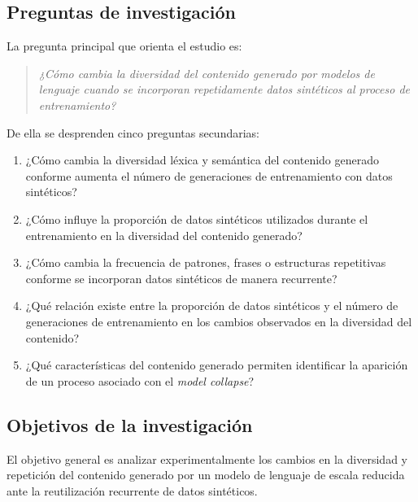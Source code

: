 \documentclass[12pt,letterpaper]{article}
\begin{document}
\subsection{Preguntas de investigación}

La pregunta principal que orienta el estudio es:

\begin{quote}
\textit{¿Cómo cambia la diversidad del contenido generado por modelos de
lenguaje cuando se incorporan repetidamente datos sintéticos al proceso
de entrenamiento?}
\end{quote}

De ella se desprenden cinco preguntas secundarias:
\begin{enumerate}
    \item ¿Cómo cambia la diversidad léxica y semántica del contenido
    generado conforme aumenta el número de generaciones de entrenamiento
    con datos sintéticos?
    \item ¿Cómo influye la proporción de datos sintéticos utilizados
    durante el entrenamiento en la diversidad del contenido generado?
    \item ¿Cómo cambia la frecuencia de patrones, frases o estructuras
    repetitivas conforme se incorporan datos sintéticos de manera
    recurrente?
    \item ¿Qué relación existe entre la proporción de datos sintéticos y
    el número de generaciones de entrenamiento en los cambios observados
    en la diversidad del contenido?
    \item ¿Qué características del contenido generado permiten identificar
    la aparición de un proceso asociado con el \textit{model collapse}?
\end{enumerate}

\subsection{Objetivos de la investigación}

El objetivo general es analizar experimentalmente los cambios en la
diversidad y repetición del contenido generado por un modelo de lenguaje
de escala reducida ante la reutilización recurrente de datos sintéticos.
\end{document}
